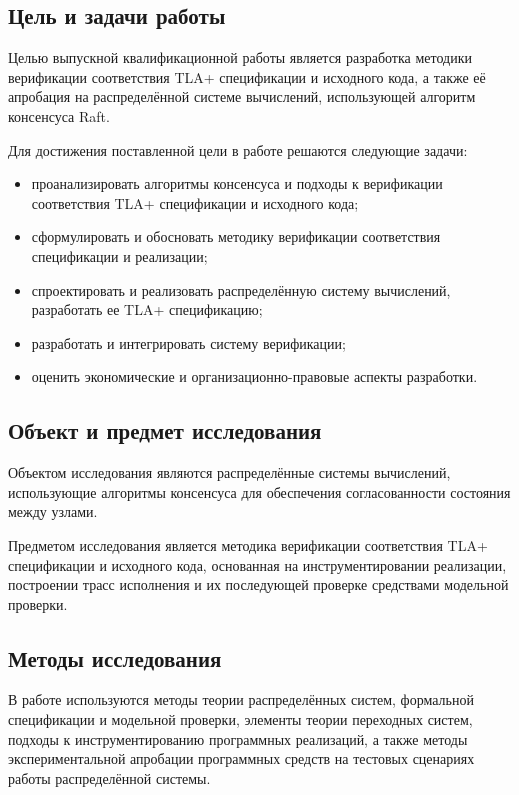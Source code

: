 \subsection*{Цель и задачи работы}

Целью выпускной квалификационной работы является разработка методики
верификации соответствия TLA+ спецификации и исходного кода, а также
её апробация на распределённой системе вычислений, использующей
алгоритм консенсуса Raft.

Для достижения поставленной цели в работе решаются следующие задачи:

\begin{itemize}
    \item проанализировать алгоритмы консенсуса и подходы к верификации
соответствия TLA+ спецификации и исходного кода;
    \item сформулировать и обосновать методику верификации соответствия
спецификации и реализации;
    \item спроектировать и реализовать распределённую систему вычислений,
разработать ее TLA+ спецификацию;
    \item разработать и интегрировать систему верификации;
    \item оценить экономические и организационно-правовые аспекты разработки.
\end{itemize}

\subsection*{Объект и предмет исследования}

Объектом исследования являются распределённые системы вычислений,
использующие алгоритмы консенсуса для обеспечения согласованности
состояния между узлами.

Предметом исследования является методика верификации соответствия
TLA+ спецификации и исходного кода, основанная на инструментировании
реализации, построении трасс исполнения и их последующей проверке
средствами модельной проверки.

\subsection*{Методы исследования}

В работе используются методы теории распределённых систем, формальной
спецификации и модельной проверки, элементы теории переходных систем,
подходы к инструментированию программных реализаций, а также методы
экспериментальной апробации программных средств на тестовых сценариях
работы распределённой системы.

